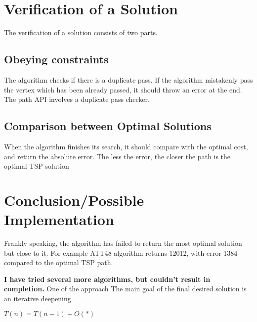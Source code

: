 \documentclass{acm_proc_article-sp}
\begin{document}
\section{Verification of a Solution}
\begin{flushleft}
The verification of a solution consists of two parts.
\end{flushleft}

\subsection{Obeying constraints}
\begin{flushleft}
The algorithm checks if there is a duplicate pass. If the algorithm mistakenly pass the vertex which has been already passed, it should throw an error at the end. The path API involves a duplicate pass checker.
\end{flushleft}

\subsection{Comparison between Optimal Solutions}
\begin{flushleft}
When the algorithm finishes its search, it should compare with the optimal cost, and return the absolute error. The less the error, the closer the path is the optimal TSP solution
\end{flushleft}

\section{Conclusion/Possible Implementation}
\begin{flushleft}
Frankly speaking, the algorithm has failed to return the most optimal solution but close to it. For example ATT48 algorithm returns 12012, with error 1384 compared to the optimal TSP path.

\textbf{I have tried several more algorithms, but couldn't result in completion.} One of the approach The main goal of the final desired solution is an iterative deepening. 
\end{flushleft}

\begin{center}
$T(n) = T(n - 1) + O(*)$
\end{center}
\end{document}
